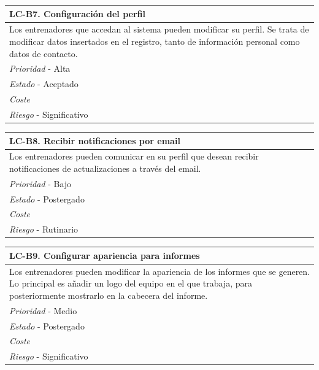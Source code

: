 	\begin{center}
		\begin{tabularx}{15cm}{|X|}
			\hline 
				\bf{LC-B7. Configuración del perfil}\\
			\hline
				Los entrenadores que accedan al sistema pueden modificar su perfil. Se trata de modificar datos insertados en el registro, tanto de información personal como datos de contacto.\\
			\hline
				{\it Prioridad} - Alta\\
			\hline
				{\it Estado} - Aceptado\\
			\hline
				{\it Coste}\\
			\hline
				{\it Riesgo} - Significativo\\
			\hline
		\end{tabularx}
	\end{center}
	
	\begin{center}
		\begin{tabularx}{15cm}{|X|}
			\hline 
				\bf{LC-B8. Recibir notificaciones por email}\\
			\hline
				Los entrenadores pueden comunicar en su perfil que desean recibir notificaciones de actualizaciones a través del email.\\
			\hline
				{\it Prioridad} - Bajo\\
			\hline
				{\it Estado} - Postergado\\
			\hline
				{\it Coste}\\
			\hline
				{\it Riesgo} - Rutinario\\
			\hline
		\end{tabularx}
	\end{center}
	
	\begin{center}
		\begin{tabularx}{15cm}{|X|}
			\hline 
				\bf{LC-B9. Configurar apariencia para informes}\\
			\hline
				Los entrenadores pueden modificar la apariencia de los informes que se generen. Lo principal es añadir un logo del equipo en el que trabaja, para posteriormente mostrarlo en la cabecera del informe.\\
			\hline
				{\it Prioridad} - Medio\\
			\hline
				{\it Estado} - Postergado\\
			\hline
				{\it Coste}\\
			\hline
				{\it Riesgo} - Significativo\\
			\hline
		\end{tabularx}
	\end{center}
	
